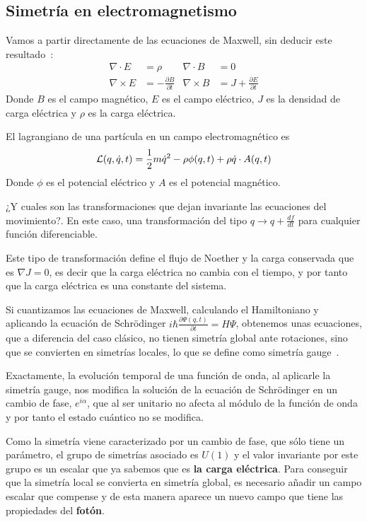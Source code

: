 \subsection{Simetría en electromagnetismo}\label{sec:simetria-en-electromagnetismo}
Vamos a partir directamente de las ecuaciones de Maxwell, sin deducir este resultado~\autocite[38]{ISMPP}:
\begin{align}
	\label{eq:maxwell}
	\nabla\cdot E & = \rho & \nabla\cdot B & = 0 \\
	\nabla\times E & = -\frac{\partial B}{\partial t} & \nabla\times B & = J+\frac{\partial E}{\partial t}
\end{align}
Donde $B$ es el campo magnético, $E$ es el campo eléctrico, $J$ es la densidad de carga eléctrica y $\rho$ es la carga eléctrica.

El lagrangiano de una partícula en un campo electromagnético es
\begin{equation}
	\label{eq:lagrangiano-electromagnetico}
	\mathcal{L}(q,\dot{q},t)=\frac{1}{2}m\dot{q}^2-\rho\phi(q, t)+\rho\dot{q}\cdot A(q,t)
\end{equation}
Donde $\phi$ es el potencial eléctrico y $A$ es el potencial magnético.

¿Y cuales son las transformaciones que dejan invariante las ecuaciones del movimiento?. En este caso, una transformación del tipo $q\longrightarrow q+\frac{df}{dt}$ para cualquier función diferenciable.

Este tipo de transformación define el flujo de Noether y la carga conservada que es $\nabla J=0$, es decir que la carga eléctrica no cambia con el tiempo, y por tanto que la carga eléctrica es una constante del sistema.

Si cuantizamos las ecuaciones de Maxwell, calculando el Hamiltoniano y aplicando la ecuación de Schrödinger $i\hbar\frac{\partial \Psi(q,t)}{\partial t}=H\Psi$, obtenemos unas ecuaciones, que a diferencia del caso clásico, no tienen simetría global ante rotaciones, sino que se convierten en simetrías locales, lo que se define como simetría gauge~\cite{MAQFT}.

Exactamente, la evolución temporal de una función de onda, al aplicarle la simetría gauge, nos modifica la solución de la ecuación de Schrödinger en un cambio de fase, $e^{i\alpha}$, que al ser unitario no afecta al módulo de la función de onda y por tanto el estado cuántico no se modifica.

Como la simetría viene caracterizado por un cambio de fase, que sólo tiene un parámetro, el grupo de simetrías asociado es $U(1)$ y el valor invariante por este grupo es un escalar que ya sabemos que es \textbf{la carga eléctrica}. Para conseguir que la simetría local se convierta en simetría global, es necesario añadir un campo escalar que compense y de esta manera aparece un nuevo campo que tiene las propiedades del \textbf{fotón}.

